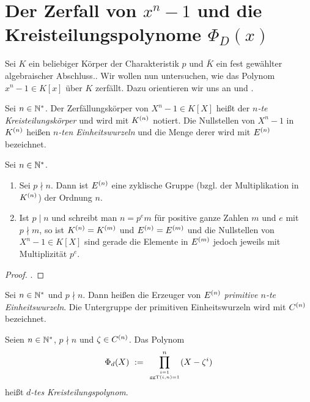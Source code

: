 \chapter{Der Zerfall von $x^n-1$ und die Kreisteilungspolynome $\Phi_D(x)$}
\label{chap:kreisteilungspolynome}

Sei $K$ ein beliebiger Körper der Charakteristik $p$ 
und $\bar K$ ein fest gewählter algebraischer
Abschluss.. Wir wollen nun untersuchen, wie das Polynom
$x^n-1 \in K[x]$ über $K$ zerfällt. Dazu orientieren wir uns 
an \autocite{lidl1997finite} und \autocite{wan2003lectures}.

\begin{definition}
  Sei $n\in\mathbb{N}^\ast$. Der Zerfällungskörper von $X^n-1 \in K[X]$ heißt
  der \emph{$n$-te Kreisteilungskörper} und wird mit $K^{(n)}$ notiert.
  Die Nullstellen von $X^n-1$ in $K^{(n)}$ heißen \emph{$n$-ten
  Einheitswurzeln} und die Menge derer wird mit $E^{(n)}$ bezeichnet.
\end{definition}


\begin{satz}
  Sei $n\in \mathbb{N}^\ast$.
  \begin{enumerate}
    \item Sei $p\nmid n$. Dann ist $E^{(n)}$ eine zyklische Gruppe (bzgl. der
      Multiplikation in $K^{(n)}$) der Ordnung $n$.
    \item Ist $p \mid n$ und schreibt man $n = p^e m$ 
      für positive ganze Zahlen $m$ und $e$ mit $p\nmid m$, so
      ist $K^{(n)} = K^{(m)}$ und $E^{(n)}= E^{(m)}$ und die Nullstellen von
      $X^n-1 \in K[X]$ sind gerade die Elemente in $E^{(m)}$ jedoch jeweils mit
      Multiplizität $p^e$.
  \end{enumerate}
\end{satz}
\begin{proof}
  \autocite[Theorem 2.42]{lidl1997finite}.
\end{proof}


\begin{definition}
  Sei $n\in \mathbb{N}^\ast$ und $p\nmid n$. Dann heißen die Erzeuger von 
  $E^{(n)}$ \emph{primitive $n$-te Einheitswurzeln}. 
  Die Untergruppe der primitiven Einheitswurzeln wird mit
  $C^{(n)}$ bezeichnet.
\end{definition}


\begin{definition}[Kreisteilungspolynom]
  Seien $n \in \mathbb{N}^\ast$, $p\nmid n$ und $\zeta \in C^{(n)}$. Das Polynom 
  \[ \Phi_d(X) \ :=\  \prod_{i=1\atop \operatorname{ggT}(i,n)=1}^n (X - \zeta^i)\]
  heißt \emph{$d$-tes Kreisteilungspolynom}.
\end{definition}

